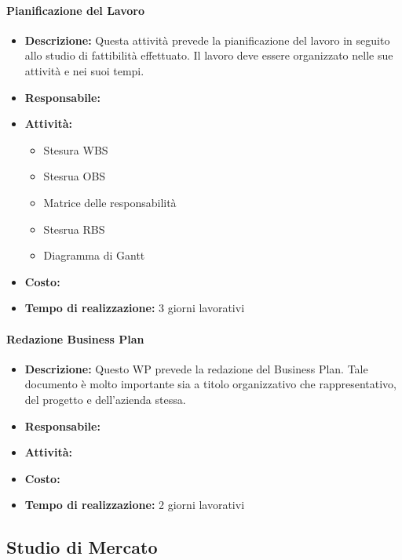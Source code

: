 \paragraph{Pianificazione del Lavoro}
\begin{itemize}
\item{\bfseries Descrizione:} Questa attività prevede la pianificazione del lavoro in seguito allo studio di fattibilità effettuato. Il lavoro deve essere organizzato nelle sue attività e nei suoi tempi.
\item {\bfseries Responsabile:}
\item  {\bfseries Attività:}
	\begin{itemize}
		\item Stesura WBS
		\item Stesrua OBS
		\item Matrice delle responsabilità
		\item Stesrua RBS
		\item Diagramma di Gantt	
	\end{itemize}

\item  {\bfseries Costo:}
\item  {\bfseries Tempo di realizzazione:} 3 giorni lavorativi
\end{itemize}


\paragraph{Redazione Business Plan}
\begin{itemize}
\item{\bfseries Descrizione:} Questo WP prevede la redazione del Business Plan. Tale documento è molto importante sia a titolo organizzativo che rappresentativo, del progetto e dell'azienda stessa.
\item {\bfseries Responsabile:}
\item  {\bfseries Attività:}
\item  {\bfseries Costo:}
\item  {\bfseries Tempo di realizzazione:} 2 giorni lavorativi
\end{itemize}


\subsection{Studio di Mercato}
